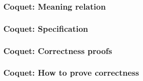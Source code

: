         \begin{frame}
            \frametitle{Coquet: Meaning relation}
        \end{frame}

        \begin{frame}
            \frametitle{Coquet: Specification}
        \end{frame}

        \begin{frame}
            \frametitle{Coquet: Correctness proofs}
        \end{frame}

        \begin{frame}
            \frametitle{Coquet: How to prove correctness}
        \end{frame}

